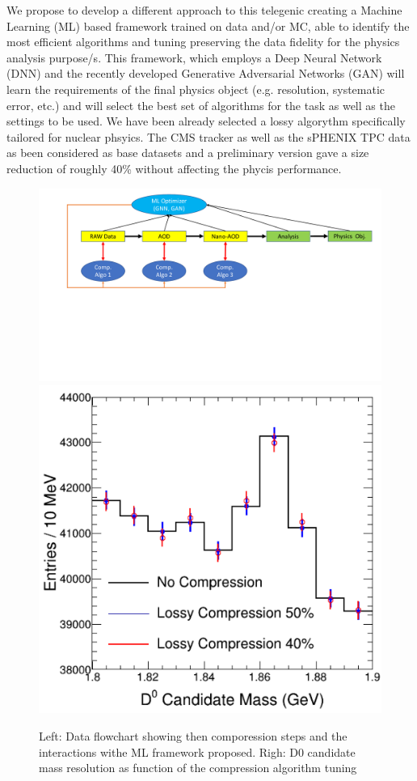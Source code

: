We propose to develop a different approach to this telegenic creating a Machine Learning (ML) based framework trained on data and/or MC, able to identify the most efficient algorithms and tuning preserving the data fidelity for the physics analysis purpose/s. This framework, which employs a Deep Neural Network (DNN) and the recently developed Generative Adversarial Networks (GAN) will learn the requirements of the final physics object (e.g. resolution, systematic error, etc.) and will select the best set of algorithms for the task as well as the settings to be used. We have been already selected a lossy algorythm specifically tailored for nuclear phsyics. The CMS tracker as well as the sPHENIX TPC data as been considered as base datasets and a preliminary version gave a size reduction of roughly 40\% without affecting the phycis performance. 

\begin{figure}[!ht]
    \vspace{-0.4cm}
    \begin{center}
    \includegraphics[width=.5\textwidth]{CompSchema.pdf}
    \hspace{0.03\textwidth}
    \includegraphics[width=.25\textwidth,keepaspectratio]{DmassVsCompRes.png}
    \vspace{-0.5cm}
    \caption{Left: Data flowchart showing then comporession steps and the interactions withe ML framework proposed. Righ: D0 candidate mass resolution as function of the compression algorithm tuning}
    \label{fig:concept}
    \end{center}
\end{figure}

